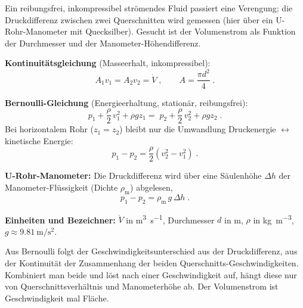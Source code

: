 


Ein reibungsfrei, inkompressibel strömendes Fluid passiert eine Verengung; die
Druckdifferenz zwischen zwei Querschnitten wird gemessen (hier über ein
U-Rohr-Manometer mit Quecksilber). Gesucht ist der Volumenstrom als Funktion
der Durchmesser und der Manometer-Höhendifferenz.

\begin{werkzeugkasten}[Werkzeuge]
\textbf{Kontinuitätsgleichung} (Masseerhalt, inkompressibel):
\begin{equation}
  A_1 v_1 = A_2 v_2 = \dot V \;,\qquad A=\frac{\pi d^2}{4}\;.
\end{equation}

\textbf{Bernoulli-Gleichung} (Energieerhaltung, stationär, reibungsfrei):
\begin{equation}
  p_1+\frac{\rho}{2}\,v_1^2+\rho g z_1
  =\; p_2+\frac{\rho}{2}\,v_2^2+\rho g z_2\;.
\end{equation}
Bei horizontalem Rohr ($z_1=z_2$) bleibt nur die Umwandlung
Druckenergie $\leftrightarrow$ kinetische Energie:
\begin{equation}
  p_1-p_2=\frac{\rho}{2}\left(v_2^2-v_1^2\right)\;.
\end{equation}

\textbf{U-Rohr-Manometer:} Die Druckdifferenz wird über eine Säulenhöhe
$\Delta h$ der Manometer-Flüssigkeit (Dichte $\rho_\mathrm{m}$) abgelesen,
\begin{equation}
  p_1-p_2=\rho_\mathrm{m}\,g\,\Delta h\;.
\end{equation}

\textbf{Einheiten und Bezeichner:} $\dot V$ in \unit{\cubic\metre\per\second},
Durchmesser $d$ in \unit{\metre}, $\rho$ in \unit{\kilogram\per\cubic\metre},
$g\approx\qty{9.81}{\metre\per\square\second}$.
\end{werkzeugkasten}

\begin{werkzeugkasten}
Aus Bernoulli folgt der Geschwindigkeitsunterschied aus der Druckdifferenz,
aus der Kontinuität der Zusammenhang der beiden Querschnitts-Geschwindigkeiten.
Kombiniert man beide und löst nach einer Geschwindigkeit auf, hängt diese nur
von Querschnittsverhältnis und Manometerhöhe ab. Der Volumenstrom ist
Geschwindigkeit mal Fläche.
\end{werkzeugkasten}

